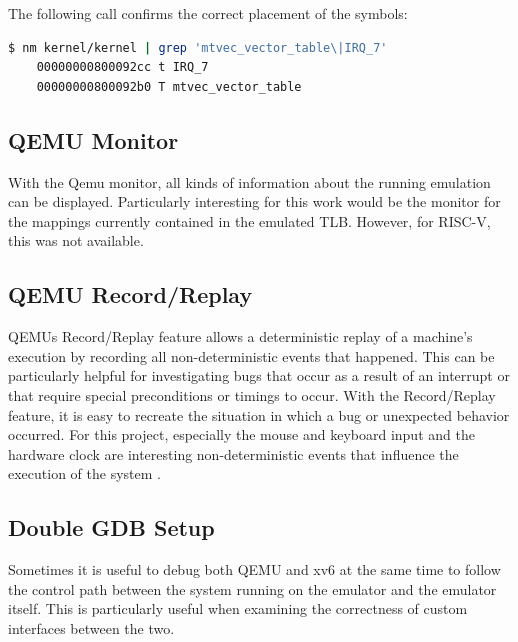 The following call confirms the correct placement of the symbols:

\begin{lstlisting}[language={sh}]
    $ nm kernel/kernel | grep 'mtvec_vector_table\|IRQ_7'
    00000000800092cc t IRQ_7
    00000000800092b0 T mtvec_vector_table
\end{lstlisting}


\subsection{QEMU Monitor}
With the Qemu monitor, all kinds of information about the running emulation can be displayed. Particularly interesting for this work would be the monitor for the mappings currently contained in the emulated TLB. However, for RISC-V, this was not available.



\subsection{QEMU Record/Replay}
QEMUs Record/Replay feature allows a deterministic replay of a machine's execution by recording
all non-deterministic events that happened. This can be particularly helpful for investigating bugs
that occur as a result of an interrupt or that require special preconditions or timings to occur.
With the Record/Replay feature, it is easy to recreate the situation in which a bug or unexpected
behavior occurred.
For this project, especially the mouse and keyboard input and the hardware clock are interesting
non-deterministic events that influence the execution of the system \cite{RecordReplayQEMU}.

\subsection{Double GDB Setup}

Sometimes it is useful to debug both QEMU and xv6 at the same time to follow the control path between the system running on the emulator and the emulator itself. This is particularly useful when examining the correctness of custom interfaces between the two.

